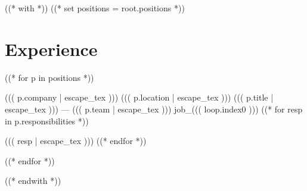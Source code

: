 ((* with *))
((* set positions = root.positions *))
\section{Experience}\relax
    \renewcommand{\labelitemi}{$\cdot$}\relax %
    ((* for p in positions *))
    \begin{job}{((( p.company | escape_tex )))}
        {((( p.location | escape_tex )))}
        {((( p.title | escape_tex ))) --- ((( p.team | escape_tex )))}
        {job_((( loop.index0 )))}
        ((* for resp in p.responsibilities *))
            \item ((( resp | escape_tex )))
        ((* endfor *))
    \end{job}

    ((* endfor *))
((* endwith *))
